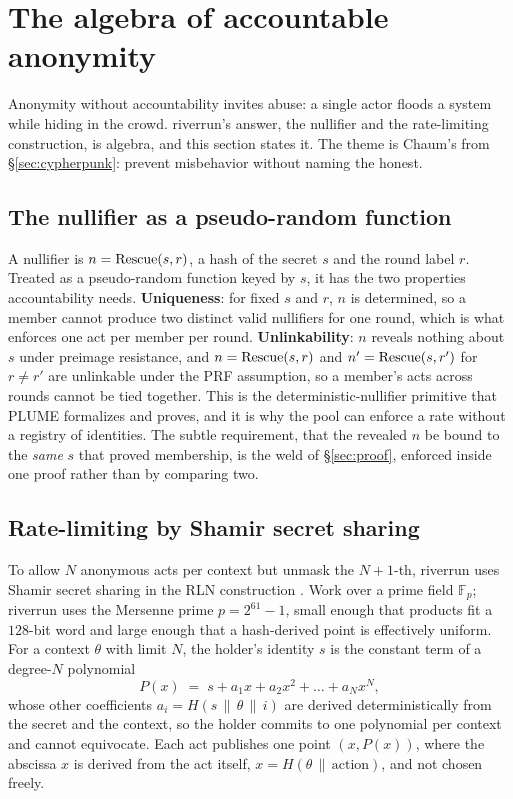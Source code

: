 \documentclass[11pt]{article}
\begin{document}
\section{The algebra of accountable anonymity}
\label{sec:math-rln}

Anonymity without accountability invites abuse: a single actor floods a system while
hiding in the crowd. riverrun's answer, the nullifier and the rate-limiting construction,
is algebra, and this section states it. The theme is Chaum's from \S\ref{sec:cypherpunk}:
prevent misbehavior without naming the honest.

\subsection{The nullifier as a pseudo-random function}

A nullifier is $n = \mathrm{Rescue}(s, r)$, a hash of the secret $s$ and the round label $r$.
Treated as a pseudo-random function keyed by $s$, it has the two properties accountability
needs. \textbf{Uniqueness}: for fixed $s$ and $r$, $n$ is determined, so a member cannot
produce two distinct valid nullifiers for one round, which is what enforces one act per
member per round. \textbf{Unlinkability}: $n$ reveals nothing about $s$ under preimage
resistance, and $n = \mathrm{Rescue}(s, r)$ and $n' = \mathrm{Rescue}(s, r')$ for $r \ne r'$ are
unlinkable under the PRF assumption, so a member's acts across rounds cannot be tied
together. This is the deterministic-nullifier primitive that PLUME \cite{plume}
formalizes and proves, and it is why the pool can enforce a rate without a registry of
identities. The subtle requirement, that the revealed $n$ be bound to the \emph{same} $s$
that proved membership, is the weld of \S\ref{sec:proof}, enforced inside one proof
rather than by comparing two.

\subsection{Rate-limiting by Shamir secret sharing}

To allow $N$ anonymous acts per context but unmask the $N{+}1$-th, riverrun uses Shamir
secret sharing \cite{shamir79} in the RLN construction \cite{rln}. Work over a prime
field $\mathbb{F}_p$; riverrun uses the Mersenne prime $p = 2^{61} - 1$, small enough that
products fit a $128$-bit word and large enough that a hash-derived point is effectively
uniform. For a context $\theta$ with limit $N$, the holder's identity $s$ is the constant
term of a degree-$N$ polynomial
\[ P(x) \;=\; s + a_1 x + a_2 x^2 + \dots + a_N x^N, \]
whose other coefficients $a_i = H(s \,\|\, \theta \,\|\, i)$ are derived deterministically
from the secret and the context, so the holder commits to one polynomial per context and
cannot equivocate. Each act publishes one point $(x, P(x))$, where the abscissa $x$ is
derived from the act itself, $x = H(\theta \,\|\, \text{action})$, and not chosen freely.
\end{document}
